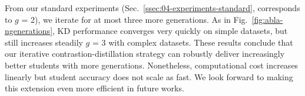 \begin{foldable}
    From our standard experiments (Sec.~\ref{ssec:04-experiments-standard}, corresponds to $g$ = 2), we iterate for at most three more generations.
    As in Fig.~\ref{fig:abla-ngenerations}, KD performance converges very quickly on simple datasets, but still increases steadily $g$ = 3 with complex datasets.
    These results conclude that our iterative contrastion-distillation strategy can robustly deliver increasingly better students with more generations.
    Nonetheless, computational cost increases linearly but student accuracy does not scale as fast.
    We look forward to making this extension even more efficient in future works.
\end{foldable}

